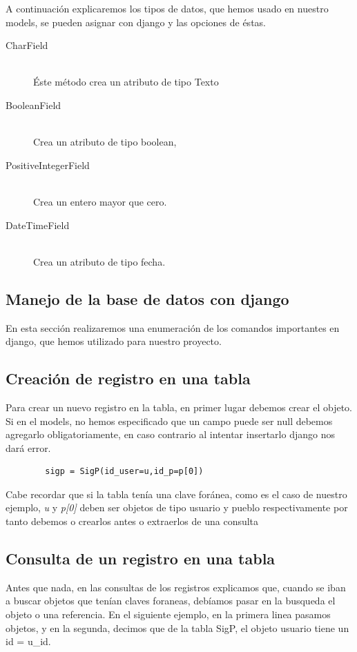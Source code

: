 A continuación explicaremos los tipos de datos, que hemos usado en nuestro models, se pueden asignar con django y las opciones de éstas.
\begin{description}
  	\item[CharField] \hfill \\
  		Éste método crea un atributo de tipo Texto
  	\item[BooleanField] \hfill \\
  		Crea un atributo de tipo boolean, 
  	\item[PositiveIntegerField] \hfill \\
  		Crea un entero mayor que cero.
  	\item[DateTimeField] \hfill \\
  		Crea un atributo de tipo fecha.
\end{description}
\subsection{Manejo de la base de datos con django}

En esta sección realizaremos una enumeración de los comandos importantes en django, que hemos utilizado para nuestro proyecto.

\subsection{Creación de registro en una tabla}

Para crear un nuevo registro en la tabla, en primer lugar debemos crear el objeto. Si en el models, no hemos especificado que un campo puede ser null debemos agregarlo obligatoriamente, en caso contrario al intentar insertarlo django nos dará error.

\begin{lstlisting}
		sigp = SigP(id_user=u,id_p=p[0])
\end{lstlisting}

Cabe recordar que si la tabla tenía una clave foránea, como es el caso de nuestro ejemplo, \textit{u} y \textit{p[0]} deben ser objetos de tipo usuario y pueblo respectivamente por tanto debemos o crearlos antes o extraerlos de una consulta

\subsection{Consulta de un registro en una tabla}

Antes que nada, en las consultas de los registros explicamos que, cuando se iban a buscar objetos que tenían claves foraneas, debíamos pasar en la busqueda el objeto o una referencia. En el siguiente ejemplo, en la primera linea pasamos objetos, y en la segunda, decimos que de la tabla SigP, el objeto usuario tiene un id = u\_id.

